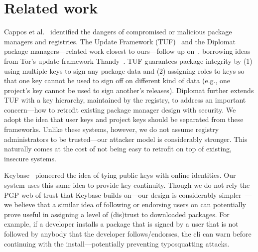 \section{Related work}
\label{sec:related}

%
Cappos et al.~\cite{cappos:look} identified the dangers of compromised
or malicious package managers and registries.
%
The Update Framework (TUF)~\cite{samuel2010survivable} and the
Diplomat~\cite{kuppusamy2016diplomat} package managers---related work closest to
ours---follow up on~\cite{cappos:look}, borrowing ideas from Tor's update
framework Thandy~\cite{thandy}.
%
TUF guarantees package integrity by (1) using multiple keys
to sign any package data and (2) assigning roles to keys so that one key cannot
be used to sign off on different kind of data (e.g., one project's key cannot
be used to sign another's releases).
%
Diplomat further extends TUF with a key hierarchy, maintained by the registry,
to address an important concern---how to retrofit existing package manager design with
security.
%
We adopt the idea that user keys and project keys should be separated from
these frameworks.
%
Unlike these systems, however, we do not assume registry administrators to be
trusted---our attacker model is considerably stronger.
%
This naturally comes at the cost of not being easy to retrofit on top of
existing, insecure systems.

Keybase~\cite{keybase} pioneered the idea of tying public keys with online
identities.
%
Our system uses this same idea to provide key continuity.
%
Though we do not rely the PGP web of trust that Keybase builds on---our design
is considerably simpler~\cite{openbsd}---we believe that a similar idea of
following or endorsing users on \spam can potentially prove useful in assigning
a level of (dis)trust to downloaded packages.
%
For example, if a developer installs a package that is signed by a user that is
not followed by anybody that the developer follows/endorses, the \spam cli can
warn before continuing with the install---potentially preventing typosquatting
attacks.


